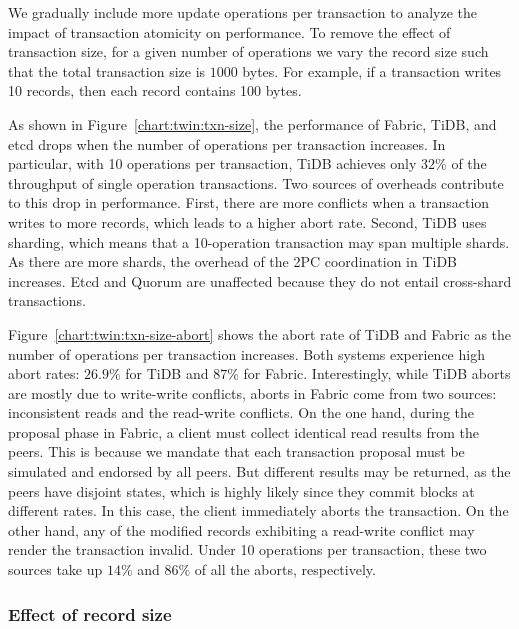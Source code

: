 We gradually include more update operations per transaction to analyze the
impact of transaction atomicity on performance. 
To remove the effect of transaction size, for a given number of operations we
vary the record size such that the total transaction size is $1000$ bytes. 
For example, if a transaction writes 10 records, then each record contains
100 bytes.

As shown in Figure~\ref{chart:twin:txn-size}, the performance of Fabric, TiDB, and etcd
drops when the number of operations per transaction increases.
In particular, with 10 operations per transaction, TiDB achieves only $32\%$ of
the throughput of single operation transactions.
Two sources of overheads contribute to this drop in performance.
First, there are more conflicts when a transaction writes to more records, which
leads to a higher abort rate.
Second, TiDB uses sharding, which means that a 10-operation transaction may span
multiple shards.
As there are more shards, the overhead of the 2PC coordination in TiDB
increases.
Etcd and Quorum are unaffected because they do not entail cross-shard
transactions.

Figure~\ref{chart:twin:txn-size-abort} shows the abort rate of TiDB and Fabric as the
number of operations per transaction increases.
Both systems experience high abort rates: $26.9\%$ for TiDB and $87\%$ for
Fabric.
Interestingly, while TiDB aborts are mostly due to write-write conflicts, aborts
in Fabric come from two sources: inconsistent reads and the read-write
conflicts.
On the one hand, during the proposal phase in Fabric, a client must collect
identical read results from the peers.
This is because we mandate that each transaction proposal must be simulated and
endorsed by all peers.
But different results may be returned, as the peers have disjoint states, which
is highly likely since they commit blocks at different rates.
In this case, the client immediately aborts the transaction.
On the other hand, any of the modified records exhibiting a read-write conflict
may render the transaction invalid.
Under 10 operations per transaction, these two sources take up $14\%$ and $86\%$
of all the aborts, respectively.

\subsubsection{Effect of record size}
\label{ch:twin:exp:txn:record_size}

